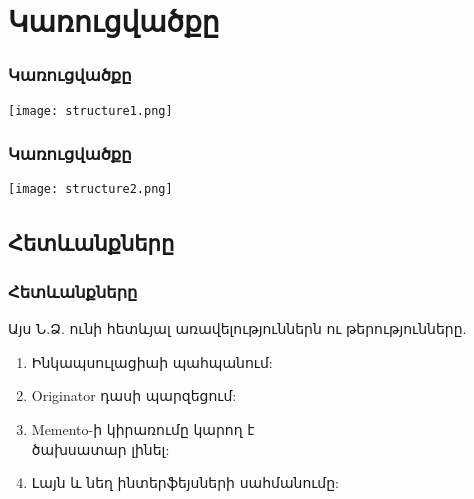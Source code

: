 \documentclass{beamer}
\begin{document}
\section{Կառուցվածքը}
\begin{frame}\frametitle{Կառուցվածքը}
\begin{center}
    \texttt{[image: structure1.png]}
\end{center}
\end{frame}

\begin{frame}\frametitle{Կառուցվածքը}
\begin{center}
    \texttt{[image: structure2.png]}
\end{center}
\end{frame}

\subsection{Հետևանքները}
\begin{frame}\frametitle{Հետևանքները}
Այս Ն.Ձ. ունի հետևյալ առավելություններն ու թերությունները.
\vfill
\begin{enumerate}
    \item Ինկապսուլացիաի պահպանում: \vfill
    \item Originator դասի պարզեցում: \vfill
    \item Memento-ի կիրառումը կարող է\\ ծախսատար լինել: \vfill
    \item Լայն և նեղ ինտերֆեյսների սահմանումը:
\end{enumerate}
\end{frame}
\end{document}
